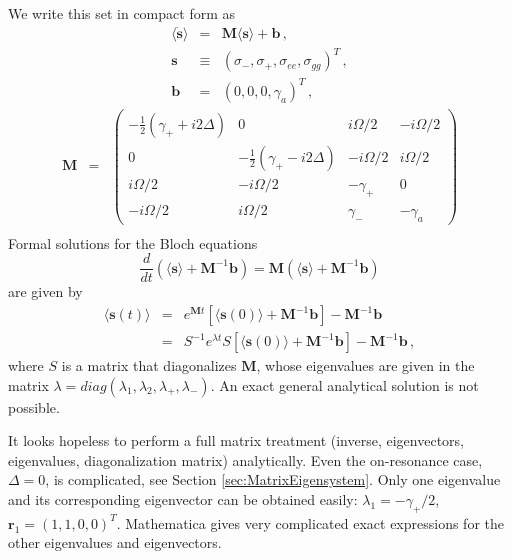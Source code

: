 \documentclass[twocolumn,aps,eqsecnum,showkeys,amsmath]{revtex4-2}
\begin{document}
We write this set in compact form as 
%
\begin{subequations}
\begin{eqnarray}
\langle \dot{\mathbf{s}} \rangle 
	&=& \mathbf{M} \langle \mathbf{s} \rangle +\mathbf{b} 	\,, \\ 
\mathbf{s} &\equiv&   
	\left( \sigma_-,  \sigma_+, \sigma_{ee}, \sigma_{gg}  \right)^T 	\,, \\ 
\mathbf{b} &=& (0,0,0,\gamma_a)^T 	\,,  
\end{eqnarray}
\end{subequations}
%
\begin{eqnarray} 	\label{eq:matrixM}
\mathbf{M} &=& \left( \begin{array}{cccc}
-\frac{1}{2}(\gamma_+ +i2\Delta) & 0 & i\Omega/2 & -i\Omega/2 \\ 
0 & -\frac{1}{2}(\gamma_+ -i2\Delta) & -i\Omega/2 & i\Omega/2 	 \\ 
i\Omega/2 & -i\Omega/2 & -\gamma_+ & 0 		\\ 
-i\Omega/2 & i\Omega/2 & \gamma_- & -\gamma_a 
\end{array}  \right) 	\nonumber \\ 
\end{eqnarray}
Formal solutions for the Bloch equations 
%
\begin{equation}
\frac{d}{dt} \left( \langle \mathbf{s} \rangle 
	+\mathbf{M}^{-1} \mathbf{b} \right) = 
\mathbf{M} \left( \langle \mathbf{s} \rangle 
	+\mathbf{M}^{-1}\mathbf{b} \right) 	
\end{equation}
are given by 
%
\begin{eqnarray}
\langle \mathbf{s}(t) \rangle &=& e^{\mathbf{M} t} \left[ 
 	\langle \mathbf{s}(0) \rangle +\mathbf{M}^{-1} \mathbf{b} \right] 
	-\mathbf{M}^{-1} \mathbf{b} 	\\
&=& S^{-1} e^{\lambda t} S \left[ 
	\langle \mathbf{s}(0) \rangle +\mathbf{M}^{-1} \mathbf{b} \right] 
	-\mathbf{M}^{-1} \mathbf{b} 	\,, \nonumber 
\end{eqnarray}
where $S$ is a matrix that diagonalizes $\mathbf{M}$, whose 
eigenvalues are given in the matrix 
$\lambda= diag(\lambda_1, \lambda_2, \lambda_+, \lambda_-)$. 
An exact general analytical solution is not possible. 

It looks hopeless to perform a full matrix treatment (inverse, eigenvectors, 
eigenvalues, diagonalization matrix) analytically. Even the on-resonance 
case, $\Delta=0$, is complicated, see Section \ref{sec:MatrixEigensystem}. 
Only one eigenvalue and its corresponding eigenvector can be obtained 
easily: $\lambda_1 =-\gamma_+/2$, $\mathbf{r}_1 =(1,1,0,0)^T$. 
Mathematica gives very complicated exact expressions for the other 
eigenvalues and eigenvectors.
\end{document}
